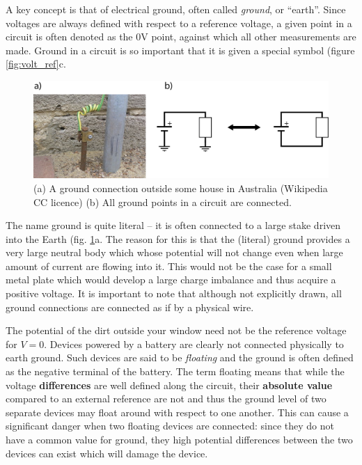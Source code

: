 \documentclass{tufte-book}
\begin{document}
A key concept is that of electrical ground, often called \textit{ground}, or ``earth''. Since voltages are always defined with respect to a reference voltage, a given point in a circuit is often denoted as the 0V point, against which all other measurements are made. Ground in a circuit is so important that it is given a special symbol (figure \ref{fig:volt_ref}c. 

\begin{figure}
\caption{(a) A ground connection outside some house in Australia (Wikipedia CC licence) (b) All ground points in a circuit are connected.}
\label{fig:ground_ref}
\begin{center}
\includegraphics[width=\textwidth]{ground_and_pound}
\end{center}
\end{figure}

The name ground is quite literal -- it is often connected to a large stake driven into the Earth (fig. \ref{fig:ground_ref}a. The reason for this is that the (literal) ground provides a very large neutral body which whose potential will not change even when large amount of current are flowing into it. This would not be the case for a small metal plate which would develop a large charge imbalance and thus acquire a positive voltage. It is important to note that although not explicitly drawn, all ground connections are connected as if by a physical wire. 

The potential of the dirt outside your window need not be the reference voltage for $V=0$. Devices powered by a battery are clearly not connected physically to earth ground. Such devices are said to be \textit{floating} and the ground is often defined as the negative terminal of the battery. The term floating means that while the voltage \textbf{differences} are well defined along the circuit, their \textbf{absolute value} compared to an external reference are not and thus the ground level of two separate devices may float around with respect to one another. This can cause a significant danger when two floating devices are connected: since they do not have a common value for ground, they high potential differences between the two devices can exist which will damage the device. 
\end{document}
